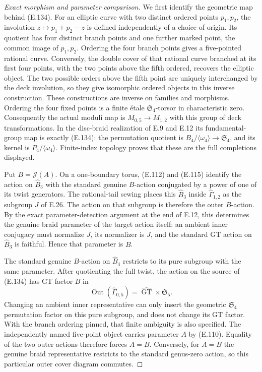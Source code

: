 \begin{proof}[Exact morphism and parameter comparison]
We first identify the geometric map behind
(E.134).  For an elliptic curve with two
distinct ordered points $p_1,p_2$, the
involution $z\mapsto p_1+p_2-z$ is defined
independently of a choice of origin.
Its quotient has four distinct branch
points and one further marked point,
the common image of $p_1,p_2$.
Ordering the four branch points gives a
five-pointed rational curve.  Conversely,
the double cover of that rational curve
branched at its first four points, with
the two points above the fifth ordered,
recovers the elliptic object.
The two possible orders above the fifth
point are uniquely interchanged by the
deck involution, so they give isomorphic
ordered objects in this inverse
construction.
These constructions are inverse on
families and morphisms.  Ordering the
four fixed points is a finite étale
$\mathfrak S_4$-torsor in characteristic
zero.  Consequently the actual moduli
map is
$M_{0,5}\to M_{1,2}$ with this group
of deck transformations.
In the disc-braid realization of E.9
and E.12 its fundamental-group map is
exactly (E.134): the permutation
quotient is
$B_4/\langle\omega_4\rangle\to
\mathfrak S_4$, and its kernel is
$P_4/\langle\omega_4\rangle$.
Finite-index topology proves that these
are the full completions displayed.

Put $B=\mathcal J(A)$.
On a one-boundary torus, (E.112) and
(E.115) identify the action on
$\widehat B_3$ with the standard genuine
$B$-action conjugated by a power of
one of its twist generators.
The rational-tail sewing places this
$\widehat B_3$ inside
$\widehat\Gamma_{1,2}$ as the subgroup
$J$ of E.26.  The action on that
subgroup is therefore the outer
$B$-action.
By the exact parameter-detection
argument at the end of E.12, this
determines the genuine braid parameter
of the target action itself: an ambient
inner conjugacy must normalize $J$,
its normalizer is $J$, and the
standard GT action on
$\widehat B_3$ is faithful.
Hence that parameter is $B$.

The standard genuine $B$-action on
$\widehat B_4$ restricts to its pure
subgroup with the same parameter.
After quotienting the full twist,
the action on the source of
(E.134) has GT factor $B$ in
\[
 \operatorname{Out}(\widehat\Gamma_{0,5})
       =\widehat{\operatorname{GT}}\times\mathfrak S_5.
\]
Changing an ambient inner
representative can only insert
the geometric $\mathfrak S_4$
permutation factor on this pure
subgroup, and does not change
its GT factor.  With the branch
ordering pinned, that finite
ambiguity is also specified.
The independently named five-point
object carries parameter $A$
by (E.110).
Equality of the two outer actions
therefore forces $A=B$.
Conversely, for $A=B$ the genuine
braid representative restricts
to the standard genus-zero action,
so this particular outer cover
diagram commutes.


\end{proof}
